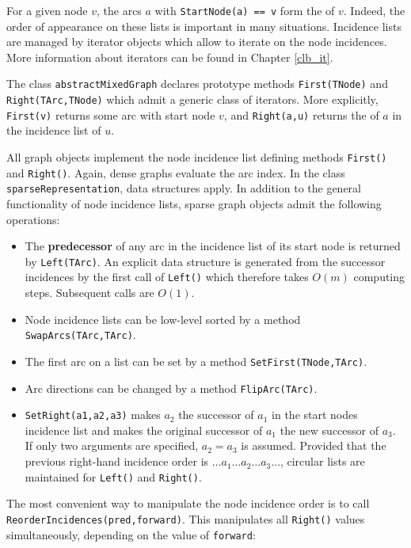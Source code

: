 \documentclass[a4paper,11pt,twoside]{book}
\begin{document}
\begin{multicols}{2}
For a given node $v$, the arcs $a$ with \verb/StartNode(a) == v/ form the
 of $v$. Indeed, the order of appearance on these lists
is important in many situations. Incidence lists are managed by iterator
objects which allow to iterate on the node incidences.
More information about iterators can be found in Chapter \ref{clb_it}.

The class \verb/abstractMixedGraph/ declares prototype methods \verb/First(TNode)/
and \verb/Right(TArc,TNode)/ which admit a generic class of iterators. More
explicitly, \verb/First(v)/ returns some arc with start node $v$, and
\verb/Right(a,u)/ returns the 
of $a$ in the incidence list of $u$.

All graph objects implement the node incidence list defining methods
\verb/First()/ and \verb/Right()/. Again, dense graphs evaluate the arc index.
In the class \verb/sparseRepresentation/, data structures apply. In addition
to the general functionality of node incidence lists, sparse graph objects
admit the following operations:
\begin{itemize}
\item
The {\bf predecessor} of any arc in the
incidence list of its start node is returned by \verb/Left(TArc)/. An explicit
data structure is generated from the successor incidences by the first call of
\verb/Left()/ which therefore takes $O(m)$ computing steps. Subsequent calls
are $O(1)$.
\item Node incidence lists can be low-level sorted by a method
    \verb/SwapArcs(TArc,TArc)/.
\item The first arc on a list can be set by a method \verb/SetFirst(TNode,TArc)/.
\item Arc directions can be changed by a method \verb/FlipArc(TArc)/.
\item \verb/SetRight(a1,a2,a3)/ makes $a_2$ the successor of $a_1$ in the start
    nodes incidence list and makes the original successor of $a_1$ the new
    successor of $a_3$. If only two arguments are specified, $a_2=a_3$ is assumed.
    Provided that the previous right-hand incidence order is $\dots a_1\dots a_2\dots a_3\dots$,
    circular lists are maintained for \verb/Left()/ and \verb/Right()/.
\end{itemize}
The most convenient way to manipulate the node incidence order is to call \verb/ReorderIncidences(pred,forward)/. This manipulates all \verb/Right()/
values simultaneously, depending on the value of \verb/forward/:

\end{multicols}
\end{document}
